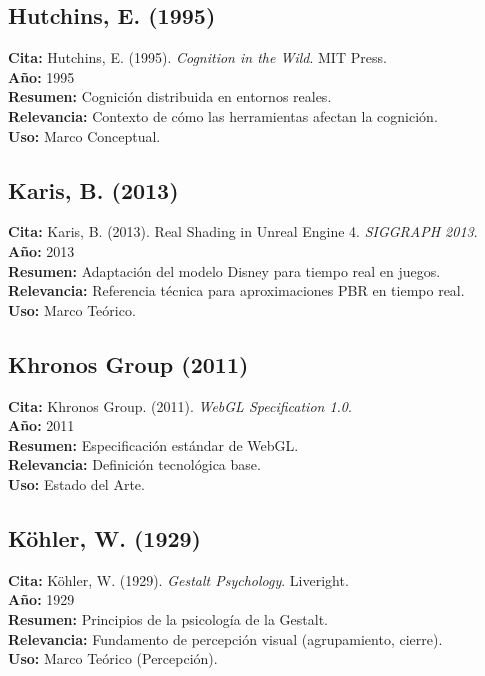 \subsection*{Hutchins, E. (1995)}
\textbf{Cita:} Hutchins, E. (1995). \textit{Cognition in the Wild}. MIT Press. \\
\textbf{Año:} 1995 \\
\textbf{Resumen:} Cognición distribuida en entornos reales. \\
\textbf{Relevancia:} Contexto de cómo las herramientas afectan la cognición. \\
\textbf{Uso:} Marco Conceptual.

\subsection*{Karis, B. (2013)}
\textbf{Cita:} Karis, B. (2013). Real Shading in Unreal Engine 4. \textit{SIGGRAPH 2013}. \\
\textbf{Año:} 2013 \\
\textbf{Resumen:} Adaptación del modelo Disney para tiempo real en juegos. \\
\textbf{Relevancia:} Referencia técnica para aproximaciones PBR en tiempo real. \\
\textbf{Uso:} Marco Teórico.

\subsection*{Khronos Group (2011)}
\textbf{Cita:} Khronos Group. (2011). \textit{WebGL Specification 1.0}. \\
\textbf{Año:} 2011 \\
\textbf{Resumen:} Especificación estándar de WebGL. \\
\textbf{Relevancia:} Definición tecnológica base. \\
\textbf{Uso:} Estado del Arte.

\subsection*{Köhler, W. (1929)}
\textbf{Cita:} Köhler, W. (1929). \textit{Gestalt Psychology}. Liveright. \\
\textbf{Año:} 1929 \\
\textbf{Resumen:} Principios de la psicología de la Gestalt. \\
\textbf{Relevancia:} Fundamento de percepción visual (agrupamiento, cierre). \\
\textbf{Uso:} Marco Teórico (Percepción).

